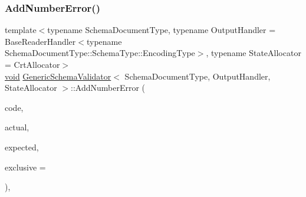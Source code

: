 \mbox{\label{classGenericSchemaValidator_a752965fdb585b99db45201579f8ff04a}} 
\subsubsection{\texorpdfstring{Add\+Number\+Error()}{AddNumberError()}}
{\footnotesize\ttfamily template$<$typename Schema\+Document\+Type, typename Output\+Handler = Base\+Reader\+Handler$<$typename Schema\+Document\+Type\+::\+Schema\+Type\+::\+Encoding\+Type$>$, typename State\+Allocator = Crt\+Allocator$>$ \\
\hyperlink{imgui__impl__opengl3__loader_8h_ac668e7cffd9e2e9cfee428b9b2f34fa7}{void} \hyperlink{classGenericSchemaValidator}{Generic\+Schema\+Validator}$<$ Schema\+Document\+Type, Output\+Handler, State\+Allocator $>$\+::Add\+Number\+Error (\begin{DoxyParamCaption}\item[{const \hyperlink{group__RAPIDJSON__ERRORS_ga2e1f88f94a5d9a6817a5de0ed2f0105a}{Validate\+Error\+Code}}]{code,  }\item[{\hyperlink{classGenericSchemaValidator_a435890a2dddeecb896d4ac76de03ca68}{Value\+Type} \&}]{actual,  }\item[{const \hyperlink{classGenericSchemaValidator_a3c004e35c7eb9fa5a28c0ccfb8ac62dc}{S\+Value} \&}]{expected,  }\item[{const typename Schema\+Type\+::\+Value\+Type \&($\ast$)()}]{exclusive = {} }\end{DoxyParamCaption})\hspace{0.3cm}{\ttfamily [inline]}, {\ttfamily [private]}}

\mbox{\label{classGenericSchemaValidator_acf4db1d2b158d7220adc228d872938ba}} 
